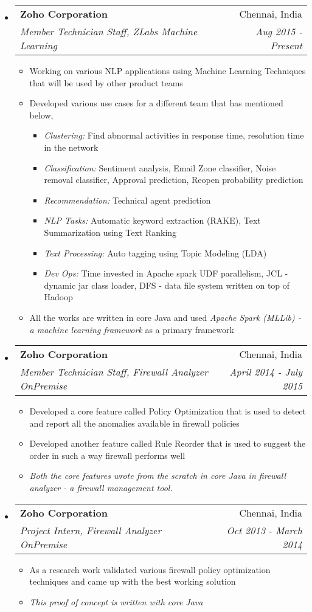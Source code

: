 \documentclass[letterpaper,11pt]{article}
\makeatletter
\newcommand{\resitem}[1]{\item #1 \vspace{-2pt}}
\newcommand{\resheading}[1]{\textbf{\sffamily{\mbox{~}{\large #1} \vphantom{p\^{E}}}}}
\newcommand{\ressubheading}[4]{
\begin{tabular*}{6.5in}{l@{\extracolsep{\fill}}r}
		\textbf{#1} & #2 \\
		\textit{#3} & \textit{#4} \\
\end{tabular*}\vspace{-6pt}}
\makeatother
\begin{document}
\vspace{0.05in}
\resheading{Work Experience}
\begin{itemize}
\item[]
	\ressubheading{Zoho Corporation}{Chennai, India}{Member Technician Staff, ZLabs Machine Learning}{Aug 2015 - Present}
	\begin{itemize}
		\resitem{Working on various NLP applications using Machine Learning Techniques that will be used by other product teams}
		\resitem{{Developed various use cases for a different team that has mentioned below,}}
		
		\begin{itemize}
			\resitem{\textit{Clustering:} Find abnormal activities in response time, resolution time in the network}
			\resitem{\textit{Classification:} Sentiment analysis, Email Zone classifier, Noise removal classifier, Approval prediction, Reopen probability prediction}
			\resitem{\textit{Recommendation:} Technical agent prediction}
			\resitem{\textit{NLP Tasks:} Automatic keyword extraction (RAKE), Text Summarization using Text Ranking}
			\resitem{\textit{Text Processing:} Auto tagging using Topic Modeling (LDA)}
			\resitem{\textit{Dev Ops:} Time invested in Apache spark UDF parallelism, JCL - dynamic jar class loader, DFS - data file system written on top of Hadoop}

		\end{itemize}
		\resitem{All the works are written in core Java and used \textit{Apache Spark (MLLib) - a machine learning framework} as a primary framework}
	\end{itemize}
	
\item[]
	\ressubheading{Zoho Corporation}{Chennai, India}{Member Technician Staff, Firewall Analyzer OnPremise}{April 2014 - July 2015}
	\begin{itemize}
		\resitem{Developed a core feature called Policy Optimization that is used to detect and report all the anomalies available in firewall policies}
		\resitem{Developed another feature called Rule Reorder that is used to suggest the order in such a way firewall performs well}

		\resitem{\textit{Both the core features wrote from the scratch in core Java in firewall analyzer - a firewall management tool.}}
	\end{itemize}

\item[]
	\ressubheading{Zoho Corporation}{Chennai, India}{Project Intern, Firewall Analyzer OnPremise}{Oct 2013 - March 2014}
	\begin{itemize}
		\resitem{As a research work validated various firewall policy optimization techniques and came up with the best working solution}
		\resitem{\textit{ This proof of concept is written with core Java}}
	\end{itemize}

\end{itemize}
\end{document}
